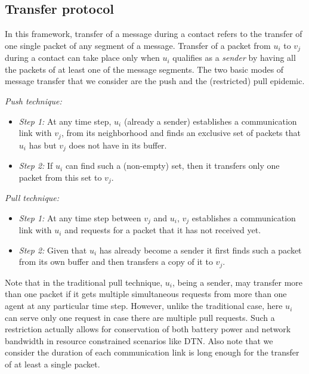 \subsection{Transfer protocol}
In this framework, transfer of a message during a contact refers to the transfer of one single packet of any segment of a message. 
Transfer of a packet from $u_i$ to $v_j$ during a contact can take place only 
when $u_i$ qualifies as a {\em sender} by having all the packets of at least one of the message segments. 
The two basic modes of message transfer that we consider are the push and the (restricted) pull epidemic. 

 \noindent \emph{Push technique:} 
  \begin{itemize}
   \item \emph{Step 1:} At any time step, $u_i$ (already a sender) establishes a communication link with $v_j$, 
   from its neighborhood and finds an exclusive set of packets that $u_i$ has but $v_j$ does not have in its buffer. 
   \item \emph{Step 2:} If $u_i$ can find such a (non-empty) set, then it transfers only one packet from this set to $v_j$. 
  \end{itemize}
 \noindent \emph{Pull technique:} 
 \begin{itemize}
  \item \emph{Step 1:} At any time step between $v_j$ and $u_i$, $v_j$ establishes a communication link with $u_i$ 
  and requests for a packet that it has not received yet. 
  \item \emph{Step 2:} Given that $u_i$ has already become a sender it first finds such a packet from its own buffer and then transfers a copy of it to $v_j$.
 \end{itemize}
  Note that in the traditional pull technique, $u_i$, being a sender, may transfer more than one packet if it gets multiple simultaneous requests from more than one agent at any particular time step. However, unlike the traditional case, here $u_i$ can serve only one request in case there are multiple pull requests. Such a restriction actually allows for conservation of both battery power and network bandwidth in resource constrained scenarios like DTN. 
 Also note that we consider the duration of each communication link is long enough for the transfer of at least a single packet.  


